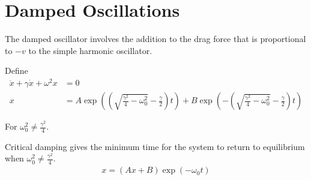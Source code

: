 \documentclass[a4paper]{article}
\numberwithin{equation}{section}
\begin{document}
\begin{example}
    
\end{example}
\section{Damped Oscillations}

The damped oscillator involves the addition to the drag force that is proportional to $-v$ to the simple harmonic oscillator.

Define
\begin{align}
    \ddot x+\gamma\dot x+\omega^2x&=0\\
    x &= A\exp(\left(\sqrt{\frac{\gamma^2}{4}-\omega_0^2}-\frac{\gamma}{2}\right)t) + B\exp(-\left(\sqrt{\frac{\gamma^2}{4}-\omega_0^2}-\frac{\gamma}{2}\right)t)
\end{align}

For $\omega_0^2\neq\frac{\gamma^2}{4}$.

Critical damping gives the minimum time for the system to return to equilibrium when $\omega_0^2\neq\frac{\gamma^2}{4}$.
\begin{align}
    x=(Ax+B)\exp(-\omega_0 t)
\end{align}
\end{document}
